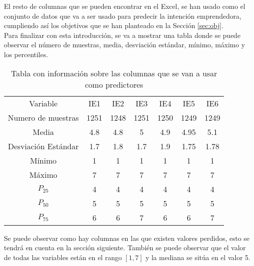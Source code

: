 El resto de columnas que se pueden encontrar en el Excel, se han usado como el conjunto de datos que va a ser usado para predecir la intención emprendedora, cumpliendo así los objetivos que se han planteado en la Sección \ref{sec:obj}.\\
\clearpage
Para finalizar con esta introducción, se va a mostrar una tabla donde se puede observar el número de muestras, media, desviación estándar, mínimo, máximo y los percentiles.
\begin{table}[H]
	\centering
	\begin{tabular}{|c|c|c|c|c|c|c|}
		\cline{1-7}
		Variable            & IE1  & IE2  & IE3  & IE4  & IE5  & IE6  \\ \cline{1-7}
		Numero de muestras  & 1251 & 1248 & 1251 & 1250 & 1249 & 1249 \\ \cline{1-7}
		Media               & 4.8  & 4.8  & 5    & 4.9  & 4.95 & 5.1  \\ \cline{1-7}
		Desviación Estándar & 1.7  & 1.8  & 1.7  & 1.9  & 1.75 & 1.78 \\ \cline{1-7}
		Mínimo              & 1    & 1    & 1    & 1    & 1    & 1    \\ \cline{1-7}
		Máximo              & 7    & 7    & 7    & 7    & 7    & 7    \\ \cline{1-7}
		$P_{25}$            & 4    & 4    & 4    & 4    & 4    & 4    \\ \cline{1-7}
		$P_{50}$            & 5    & 5    & 5    & 5    & 5    & 5    \\ \cline{1-7}
		$P_{75}$            & 6    & 6    & 7    & 6    & 6    & 7    \\ \cline{1-7}
	\end{tabular}
	\caption{Tabla con información sobre las columnas que se van a usar como predictores}
\end{table}
Se puede observar como hay columnas en las que existen valores perdidos, esto se tendrá en cuenta en la sección siguiente. También se puede observar que el valor de todas las variables están en el rango $\left[1,7\right]$ y la mediana se sitúa en el valor 5.
